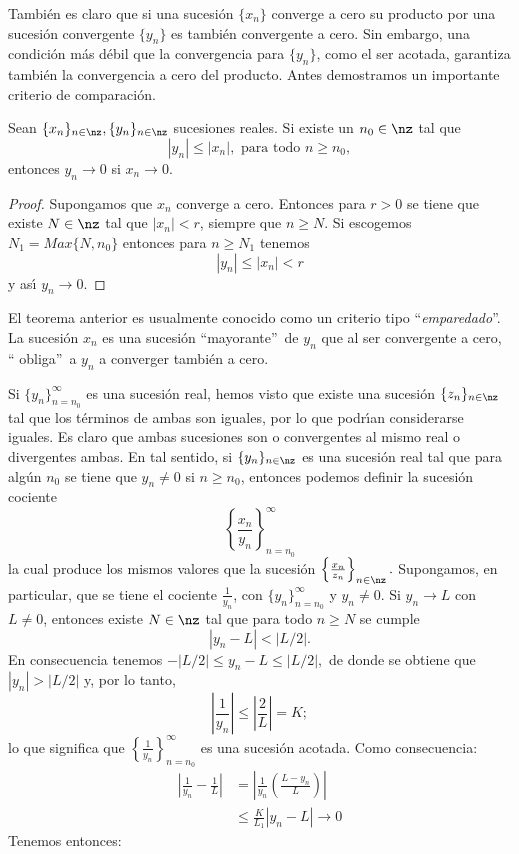Tambi\'{e}n es claro que si una sucesi\'{o}n $\{x_{n}\}$ converge a cero su
producto por una sucesi\'{o}n convergente $\{y_{n}\}$ es tambi\'{e}n
convergente a cero. Sin embargo, una condici\'{o}n m\'{a}s d\'{e}bil que la
convergencia para $\{y_{n}\}$, como el ser acotada, garantiza tambi\'{e}n la
convergencia a cero del producto. Antes demostramos un importante criterio de comparaci\'{o}n.

\begin{theorem}
\label{emparedado}%
Sean $\{x_{n}\}_{n\in\nz},\{y_{n}\}_{n\in\nz}$ sucesiones reales. Si existe un
$n_{0}\in\nz$ tal que
\[
|y_{n}|\leq|x_{n}|,\mbox{ \ para todo \ }n\geq n_{0},
\]
entonces $y_{n}\rightarrow0$ si $x_{n}\rightarrow0$.
\end{theorem}

\begin{proof}
Supongamos que $x_{n}$ converge a cero. Entonces para $r>0$ se tiene que
existe $N\in\nz$ tal que $|x_{n}|<r$, siempre que $n\geq N$. Si escogemos
$N_{1}=Max\{N,n_{0}\}$ entonces para $n\geq N_{1}$ tenemos
\[
|y_{n}|\leq|x_{n}|<r
\]
y as\'{\i} $y_{n}\rightarrow0$.
\end{proof}

El teorema anterior es usualmente conocido como un criterio tipo
\textquotedblleft\textit{emparedado}\textquotedblright. La sucesi\'{o}n
$x_{n}$ es una sucesi\'{o}n \textquotedblleft mayorante\textquotedblright\ de
$y_{n}$ que al ser convergente a cero, \textquotedblleft
obliga\textquotedblright\ a $y_{n}$ a converger tambi\'{e}n a cero.

Si $\{y_{n}\}_{n=n_{0}}^{\infty}$ es una sucesi\'{o}n real, hemos visto que
existe una sucesi\'{o}n $\{z_{n}\}_{n\in\nz}$ tal que los t\'{e}rminos de
ambas son iguales, por lo que podr\'{\i}an considerarse iguales. Es claro que
ambas sucesiones son o convergentes al mismo real o divergentes ambas. En tal
sentido, si $\{y_{n}\}_{n\in\nz}$ es una sucesi\'{o}n real tal que para
alg\'{u}n $n_{0}$ se tiene que $y_{n}\neq0$ si $n\geq n_{0}$, entonces podemos
definir la sucesi\'{o}n cociente
\[
\left\{  \frac{x_{n}}{y_{n}}\right\}  _{n=n_{0}}^{\infty}%
\]
la cual produce los mismos valores que la sucesi\'{o}n $\left\{  \frac{x_{n}%
}{z_{n}}\right\}  _{n\in\nz}.$ Supongamos, en particular, que se tiene el
cociente $\frac{1}{y_{n}}$, con $\{y_{n}\}_{n=n_{0}}^{\infty}$ y $y_{n}\neq0$.
Si $y_{n}\rightarrow L$ con $L\neq0$, entonces existe $N\in\nz$ tal que para
todo $n\geq N$ se cumple
\[
|y_{n}-L|<|L/2|.
\]
En consecuencia tenemos $-|L/2|\leq y_{n}-L\leq|L/2|,$ de donde se obtiene que
$|y_{n}|>|L/2|$ y, por lo tanto,
\[
\left\vert \frac{1}{y_{n}}\right\vert \leq\left\vert \frac{2}{L}\right\vert
=K;
\]
lo que significa que $\left\{  \frac{1}{y_{n}}\right\}  _{n=n_{0}}^{\infty}$
es una sucesi\'{o}n acotada. Como consecuencia:
\begin{align*}
\left\vert \frac{1}{y_{n}}-\frac{1}{L}\right\vert  &  =\left\vert \frac
{1}{y_{n}}\left(  \frac{L-y_{n}}{L}\right)  \right\vert \\
&  \leq\frac{K}{L_{1}}|y_{n}-L|\rightarrow0
\end{align*}
Tenemos entonces:

